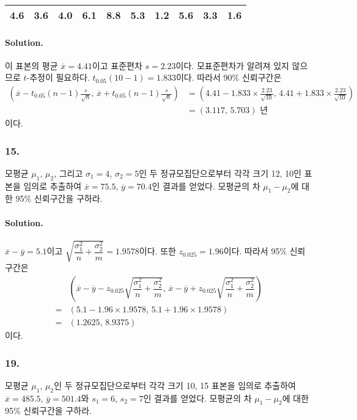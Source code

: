 \begin{center}
    \begin{tabular}{cccccccccc}
        \hline
        4.6 & 3.6 & 4.0 & 6.1 & 8.8 & 5.3 & 1.2 & 5.6 & 3.3 & 1.6 \\
        \hline
    \end{tabular}
\end{center}

\paragraph{Solution.} 이 표본의 평균 $\overline{x}=4.41$이고 표준편차 $s=2.23$이다. 모표준편차가 알려져 있지 않으므로 $t$-추정이 필요하다.
$t_{0.05}\left(10-1\right)=1.833$이다. 따라서 90\% 신뢰구간은
\begin{align*}
    \left(\overline{x}-t_{0.05}\left(n-1\right)\frac{s}{\sqrt{n}},\,\overline{x}+t_{0.05}\left(n-1\right)\frac{s}{\sqrt{n}}\right)
    &= \left(4.41-1.833\times\frac{2.23}{\sqrt{10}},\,4.41+1.833\times\frac{2.23}{\sqrt{10}}\right) \\
    &= \left(3.117,\,5.703\right)\mbox{ 년}
\end{align*}
이다.

\subsubsection{15.} 모평균 $\mu_1$, $\mu_2$, 그리고 $\sigma_1=4$, $\sigma_2=5$인 두 정규모집단으로부터 각각 크기 12, 10인 표본을
임의로 추출하여 $\overline{x}=75.5$, $\overline{y}=70.4$인 결과를 얻었다. 모평균의 차 $\mu_1-\mu_2$에 대한 95\% 신뢰구간을 구하라.
\paragraph{Solution.} $\overline{x}-\overline{y}=5.1$이고 $\sqrt{\dfrac{\sigma_1^2}{n}+\dfrac{\sigma_2^2}{m}}=1.9578$이다.
또한 $z_{0.025}=1.96$이다. 따라서 95\% 신뢰구간은
\begin{align*}
     & \left(\overline{x}-\overline{y}-z_{0.025}\sqrt{\dfrac{\sigma_1^2}{n}+\dfrac{\sigma_2^2}{m}},\,\overline{x}-\overline{y}+z_{0.025}\sqrt{\dfrac{\sigma_1^2}{n}+\dfrac{\sigma_2^2}{m}}\right)\\
    =& \left(5.1-1.96\times1.9578,\,5.1+1.96\times1.9578\right) \\
    =& \left(1.2625,\,8.9375\right)
\end{align*}
이다.

\subsubsection{19.} 모평균 $\mu_1$, $\mu_2$인 두 정규모집단으로부터 각각 크기 10, 15 표본을
임의로 추출하여 $\overline{x}=485.5$, $\overline{y}=501.4$와 $s_1=6$, $s_2=7$인 결과를 얻었다.
모평균의 차 $\mu_1-\mu_2$에 대한 95\% 신뢰구간을 구하라.

